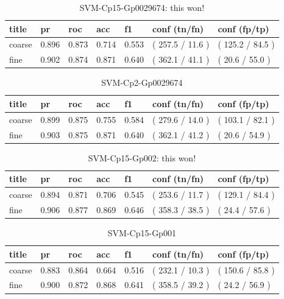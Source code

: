 \documentclass[ms]{nuthesis}
\begin{document}
\FloatBarrier
\begin{table}[H]
\centering
\begin{tabular}{|l||l||l||l||l||l||l|}\toprule
title & pr & roc & acc & f1 & conf (tn/fn) & conf (fp/tp) \\ \midrule
coarse & 0.896 & 0.873 & 0.714 & 0.553 & ( 257.5 / 11.6 ) & ( 125.2 / 84.5 ) \\
fine & 0.902 & 0.874 & 0.871 & 0.640 & ( 362.1 / 41.1 ) & ( 20.6 / 55.0 ) \\ \bottomrule
\end{tabular}
\caption{SVM-Cp15-Gp0029674: this won!}
\label{tab:SVM-Cp15-Gp0029674}
\end{table}
\FloatBarrier


\FloatBarrier
\begin{table}[H]
\centering
\begin{tabular}{|l||l||l||l||l||l||l|}\toprule
title & pr & roc & acc & f1 & conf (tn/fn) & conf (fp/tp) \\ \midrule
coarse & 0.899 & 0.875 & 0.755 & 0.584 & ( 279.6 / 14.0 ) & ( 103.1 / 82.1 ) \\
fine & 0.903 & 0.875 & 0.871 & 0.640 & ( 362.1 / 41.2 ) & ( 20.6 / 54.9 ) \\ \bottomrule
\end{tabular}
\caption{SVM-Cp2-Gp0029674}
\label{tab:SVM-Cp2-Gp0029674}
\end{table}
\FloatBarrier


\FloatBarrier
\begin{table}[H]
\centering
\begin{tabular}{|l||l||l||l||l||l||l|}\toprule
title & pr & roc & acc & f1 & conf (tn/fn) & conf (fp/tp) \\ \midrule
coarse & 0.894 & 0.871 & 0.706 & 0.545 & ( 253.6 / 11.7 ) & ( 129.1 / 84.4 ) \\
fine & 0.906 & 0.877 & 0.869 & 0.646 & ( 358.3 / 38.5 ) & ( 24.4 / 57.6 ) \\ \bottomrule
\end{tabular}
\caption{SVM-Cp15-Gp002: this won!}
\label{tab:SVM-Cp15-Gp002}
\end{table}
\FloatBarrier

\FloatBarrier
\begin{table}[H]
\centering
\begin{tabular}{|l||l||l||l||l||l||l|}\toprule
title & pr & roc & acc & f1 & conf (tn/fn) & conf (fp/tp) \\ \midrule
coarse & 0.883 & 0.864 & 0.664 & 0.516 & ( 232.1 / 10.3 ) & ( 150.6 / 85.8 ) \\
fine & 0.900 & 0.872 & 0.868 & 0.641 & ( 358.5 / 39.2 ) & ( 24.2 / 56.9 ) \\ \bottomrule
\end{tabular}
\caption{SVM-Cp15-Gp001}
\label{tab:SVM-Cp15-Gp001}
\end{table}
\FloatBarrier
\end{document}
